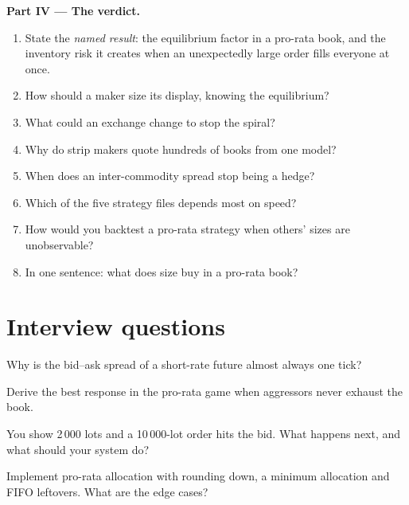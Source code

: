 \begin{problem}
\medskip\noindent\textbf{Part IV --- The verdict.}
\begin{enumerate}[resume]
\item State the \emph{named result}: the equilibrium  factor in a pro-rata book, and the inventory risk it creates when an unexpectedly
large order fills everyone at once.
\item How should a maker size its display, knowing the equilibrium?
\item What could an exchange change to stop the spiral?
\item Why do strip makers quote hundreds of books from one model?
\item When does an inter-commodity spread stop being a hedge?
\item Which of the five strategy files depends most on speed?
\item How would you backtest a pro-rata strategy when others' sizes are unobservable?
\item In one sentence: what does size buy in a pro-rata book?
\end{enumerate}
\end{problem}

\section{Interview questions}

\begin{interviewq}\label{iq:hf:futures-market-making:1}
Why is the bid--ask spread of a short-rate future almost always one tick?
\end{interviewq}

\begin{interviewq}\label{iq:hf:futures-market-making:2}
Derive the best response in the pro-rata game when aggressors never exhaust the book.
\end{interviewq}

\begin{interviewq}\label{iq:hf:futures-market-making:3}
You show 2\,000 lots and a 10\,000-lot order hits the bid. What happens next, and what should your system do?
\end{interviewq}

\begin{interviewq}\label{iq:hf:futures-market-making:4}
Implement pro-rata allocation with rounding down, a minimum allocation and FIFO leftovers. What are the edge cases?
\end{interviewq}

